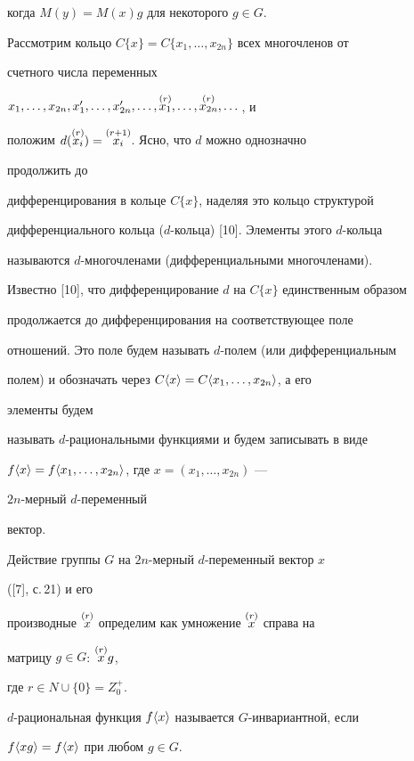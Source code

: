 когда $M(y)=M(x)g$ для некоторого $g\in G$.





Рассмотрим кольцо $C\{x\}=C\{x_1,\dotsc,x_{2n}\}$ всех многочленов от


счетного числа переменных


$x_1,\dotsc,x_{2n},x'_1,\dotsc,x'_{2n},\dotsc,


\up{(r)}{x_1},\dotsc,\up{(r)}{x_{2n}},\dotsc$, и


положим $d(\overset{(r)}{x_i}{})=\overset{(r+1)}{x_i}{}$. Ясно, что $d$ можно однозначно 


продолжить до


дифференцирования в кольце $C\{x\}$, наделяя это кольцо структурой 


дифференциального кольца ($d$-кольца) [10]. Элементы этого $d$-кольца 


называются $d$-многочленами (дифференциальными многочленами). 


Известно [10], что дифференцирование $d$ на $C\{x\}$ единственным образом 


продолжается до дифференцирования на соответствующее поле 


отношений. Это поле будем называть $d$-полем (или дифференциальным 


полем) и обозначать через $C\langle x\rangle=C\langle x_1,\dotsc,x_{2n}\rangle$, а его 


элементы будем 


называть $d$-рациональными функциями и будем записывать в виде 


$f\langle x\rangle=f\langle x_1,\dotsc,x_{2n}\rangle$, где $x=(x_1,\dotsc,x_{2n})$ --- 


$2n$-мерный $d$-переменный


вектор.





Действие группы $G$ на $2n$-мерный $d$-переменный вектор $x$


([7], с.\,21) и его


производные $\overset{(r)}{x}{}$ определим как умножение $\overset{(r)}{x}{}$ справа на 


матрицу $g\in G$: $\overset{(r)}{x}{}g$,


где $r\in N\cup\{0\}=Z^+_0$.





$d$-рациональная функция $f\langle x\rangle$ называется $G$-инвариантной, если 


$f\langle x g\rangle=f\langle x\rangle$ при любом $g\in G$.





